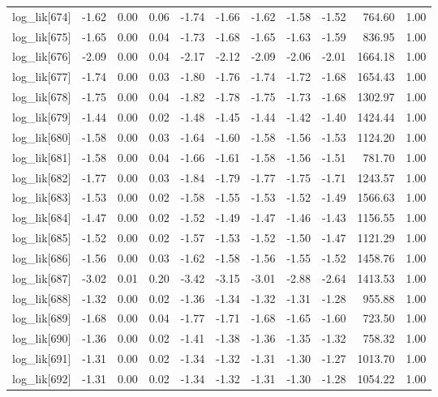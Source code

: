 \begin{table}[ht]
\begin{tabular}{rrrrrrrrrrr}
  log\_lik[674] & -1.62 & 0.00 & 0.06 & -1.74 & -1.66 & -1.62 & -1.58 & -1.52 & 764.60 & 1.00 \\ 
  log\_lik[675] & -1.65 & 0.00 & 0.04 & -1.73 & -1.68 & -1.65 & -1.63 & -1.59 & 836.95 & 1.00 \\ 
  log\_lik[676] & -2.09 & 0.00 & 0.04 & -2.17 & -2.12 & -2.09 & -2.06 & -2.01 & 1664.18 & 1.00 \\ 
  log\_lik[677] & -1.74 & 0.00 & 0.03 & -1.80 & -1.76 & -1.74 & -1.72 & -1.68 & 1654.43 & 1.00 \\ 
  log\_lik[678] & -1.75 & 0.00 & 0.04 & -1.82 & -1.78 & -1.75 & -1.73 & -1.68 & 1302.97 & 1.00 \\ 
  log\_lik[679] & -1.44 & 0.00 & 0.02 & -1.48 & -1.45 & -1.44 & -1.42 & -1.40 & 1424.44 & 1.00 \\ 
  log\_lik[680] & -1.58 & 0.00 & 0.03 & -1.64 & -1.60 & -1.58 & -1.56 & -1.53 & 1124.20 & 1.00 \\ 
  log\_lik[681] & -1.58 & 0.00 & 0.04 & -1.66 & -1.61 & -1.58 & -1.56 & -1.51 & 781.70 & 1.00 \\ 
  log\_lik[682] & -1.77 & 0.00 & 0.03 & -1.84 & -1.79 & -1.77 & -1.75 & -1.71 & 1243.57 & 1.00 \\ 
  log\_lik[683] & -1.53 & 0.00 & 0.02 & -1.58 & -1.55 & -1.53 & -1.52 & -1.49 & 1566.63 & 1.00 \\ 
  log\_lik[684] & -1.47 & 0.00 & 0.02 & -1.52 & -1.49 & -1.47 & -1.46 & -1.43 & 1156.55 & 1.00 \\ 
  log\_lik[685] & -1.52 & 0.00 & 0.02 & -1.57 & -1.53 & -1.52 & -1.50 & -1.47 & 1121.29 & 1.00 \\ 
  log\_lik[686] & -1.56 & 0.00 & 0.03 & -1.62 & -1.58 & -1.56 & -1.55 & -1.52 & 1458.76 & 1.00 \\ 
  log\_lik[687] & -3.02 & 0.01 & 0.20 & -3.42 & -3.15 & -3.01 & -2.88 & -2.64 & 1413.53 & 1.00 \\ 
  log\_lik[688] & -1.32 & 0.00 & 0.02 & -1.36 & -1.34 & -1.32 & -1.31 & -1.28 & 955.88 & 1.00 \\ 
  log\_lik[689] & -1.68 & 0.00 & 0.04 & -1.77 & -1.71 & -1.68 & -1.65 & -1.60 & 723.50 & 1.00 \\ 
  log\_lik[690] & -1.36 & 0.00 & 0.02 & -1.41 & -1.38 & -1.36 & -1.35 & -1.32 & 758.32 & 1.00 \\ 
  log\_lik[691] & -1.31 & 0.00 & 0.02 & -1.34 & -1.32 & -1.31 & -1.30 & -1.27 & 1013.70 & 1.00 \\ 
  log\_lik[692] & -1.31 & 0.00 & 0.02 & -1.34 & -1.32 & -1.31 & -1.30 & -1.28 & 1054.22 & 1.00 \\ 

\end{tabular}
\end{table}
